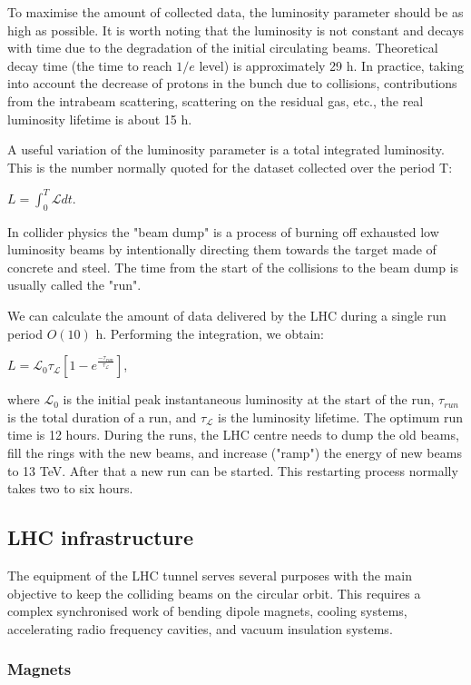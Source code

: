 To maximise the amount of collected data, the luminosity parameter should be as high as possible. It is worth noting that the luminosity is not constant and decays with time due to the degradation of the initial circulating beams. Theoretical decay time (the time to reach $1/e$ level) is approximately 29 h. In practice, taking into account the decrease of protons in the bunch due to collisions, contributions from the intrabeam scattering, scattering on the residual gas, etc., the real luminosity lifetime is about 15 h. 

A useful variation of the luminosity parameter is a total integrated luminosity. This is the number normally quoted for the dataset collected over the period T:

$L = \int_{0}^{T} \mathcal{L}  dt$.

In collider physics the "beam dump" is a process of burning off exhausted low luminosity beams by intentionally directing them towards the target made of concrete and steel. The time from the start of the collisions to the beam dump is usually called the "run".

We can calculate the amount of data delivered by the LHC during a single run period $O(10)$ h. Performing the integration, we obtain: 

 $L = \mathcal{L}_0 \tau_\mathcal{L}  \left[  1- e^{\frac{-\tau_{run}}{\tau_\mathcal{L} }}  \right]$, 

\noindent where $\mathcal{L}_0$ is the initial peak instantaneous luminosity at the start of the run, $\tau_{run}$ is the total duration of a run, and $\tau_\mathcal{L}$ is the luminosity lifetime. The optimum run time is 12 hours. During the runs, the LHC centre needs to dump the old beams, fill the rings with the new beams, and increase ("ramp") the energy of new beams to 13 TeV. After that a new run can be started. This restarting process normally takes two to six hours.



\subsection{LHC infrastructure}

The equipment of the LHC tunnel serves several purposes with the main objective to keep the colliding beams on the circular orbit. This requires a complex synchronised work of bending dipole magnets, cooling systems, accelerating radio frequency cavities, and vacuum insulation systems.

\subsubsection{Magnets}\label{sec:magnets}

